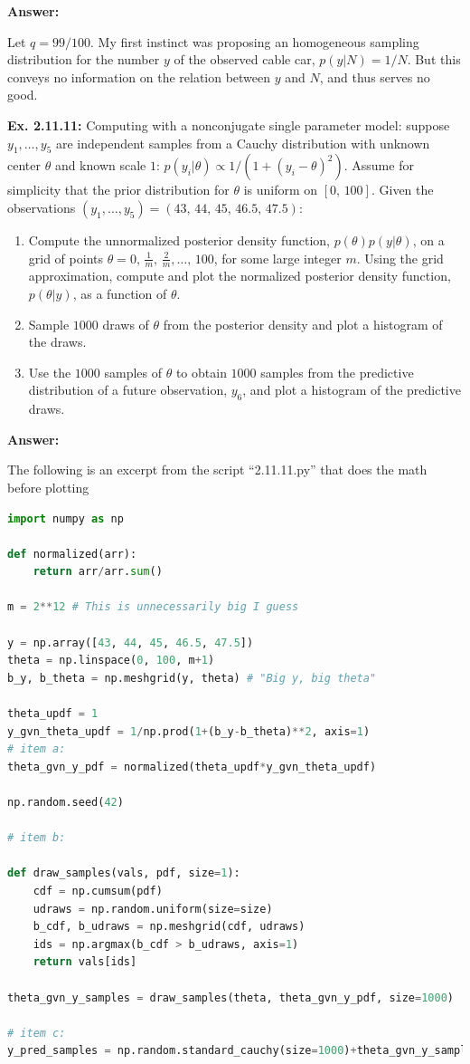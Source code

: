 \documentclass{article}
\begin{document}
\textbf{Answer:}

Let $q=99/100$. My first instinct was proposing an homogeneous sampling distribution for the number $y$ of the observed cable car, $p(y|N)=1/N$. But this conveys no information on the relation between $y$ and $N$, and thus serves no good.


\textbf{Ex. 2.11.11: }Computing with a nonconjugate single parameter model: suppose $y_1,\ldots,y_5$ are independent samples from a Cauchy distribution with unknown center $\theta$ and known scale $1$: $p(y_i|\theta)\propto1/(1+(y_i-\theta)^2)$. Assume for simplicity that the prior distribution for $\theta$ is uniform on $[0,\,100]$. Given the observations $(y_1,\ldots,y_5)=(43,\,44,\,45,\,46.5,\,47.5)$:
\begin{enumerate}[label=\alph*]
	\item Compute the unnormalized posterior density function, $p(\theta)p(y|\theta)$, on a grid of points $\theta=0,\,\frac1m,\,\frac2m,\ldots,\,100$, for some large integer $m$. Using the grid approximation, compute and plot the normalized posterior density function, $p(\theta|y)$, as a function of $\theta$.
	\item Sample $1000$ draws of $\theta$ from the posterior density and plot a histogram of the draws.
	\item Use the $1000$ samples of $\theta$ to obtain $1000$ samples from the predictive distribution of a future observation, $y_6$, and plot a histogram of the predictive draws.
\end{enumerate}

\textbf{Answer:}

The following is an excerpt from the script ``2.11.11.py'' that does the math before plotting
\begin{lstlisting}[language=Python]
import numpy as np

def normalized(arr):
    return arr/arr.sum()

m = 2**12 # This is unnecessarily big I guess

y = np.array([43, 44, 45, 46.5, 47.5])
theta = np.linspace(0, 100, m+1)
b_y, b_theta = np.meshgrid(y, theta) # "Big y, big theta"

theta_updf = 1
y_gvn_theta_updf = 1/np.prod(1+(b_y-b_theta)**2, axis=1)
# item a:
theta_gvn_y_pdf = normalized(theta_updf*y_gvn_theta_updf)

np.random.seed(42)

# item b:

def draw_samples(vals, pdf, size=1):
    cdf = np.cumsum(pdf)
    udraws = np.random.uniform(size=size)
    b_cdf, b_udraws = np.meshgrid(cdf, udraws)
    ids = np.argmax(b_cdf > b_udraws, axis=1)
    return vals[ids]

theta_gvn_y_samples = draw_samples(theta, theta_gvn_y_pdf, size=1000)

# item c:
y_pred_samples = np.random.standard_cauchy(size=1000)+theta_gvn_y_samples
\end{lstlisting}
\end{document}

